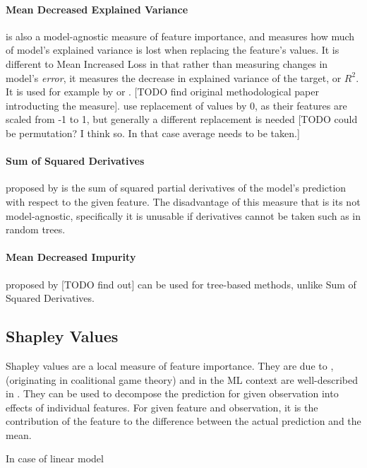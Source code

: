 			\paragraph{Mean Decreased Explained Variance} is also a model-agnostic measure of feature importance, and measures how much of model's explained variance is lost when replacing the feature's values.  It is different to Mean Increased Loss in that rather than measuring changes in model's \textit{error}, it measures the decrease in explained variance of the target, or $R^2$. It is used for example by \cite{gu2020empirical} or \cite{kelly2019characteristics}. [TODO find original methodological paper introducting the measure].  \cite{gu2020empirical} use replacement of values by 0, as their features are scaled from -1 to 1, but generally a different replacement is needed [TODO could be permutation? I think so. In that case average needs to be taken.]
			
			\paragraph{Sum of Squared Derivatives} proposed by \cite{dimopoulos1995use} is the sum of squared partial derivatives of the model's prediction with respect to the given feature. The disadvantage of this measure that is its not model-agnostic, specifically it is unusable if derivatives cannot be taken such as in random trees. 
			
			\paragraph{Mean Decreased Impurity} proposed by [TODO find out] can be used for tree-based methods, unlike Sum of Squared Derivatives.   
		
		\subsection{Shapley Values}
		
		Shapley values are a local measure of feature importance. They are due to \cite{shapley1953value}, 
		(originating in coalitional game theory) and in the ML context are well-described in \cite{molnar2020interpretable}. They can be used to decompose the prediction for given observation into effects of individual features. For given feature and observation, it is the contribution of the feature to the difference between the actual prediction and the mean.  
		
		In case of linear model
		
